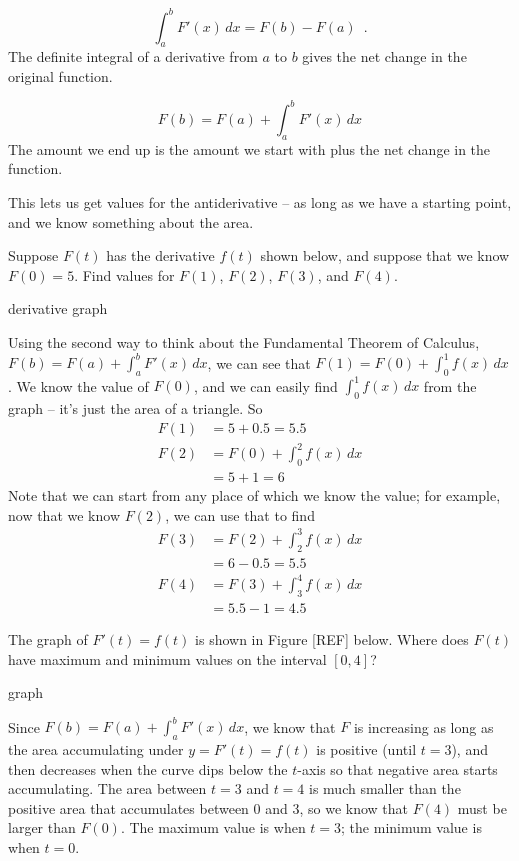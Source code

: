 \begin{theorem}
$$\int_a^b F'(x)\,dx = F(b)-F(a) \enspace .$$
The definite integral of a derivative from $a$ to $b$ gives the net change in the original function.

$$F(b)=F(a)+\int_a^b F'(x)\,dx$$
The amount we end up is the amount we start with plus the net change in the function.

This lets us get values for the antiderivative – as long as we have a starting point, and we know something about the area.

\begin{example}
Suppose $F(t)$ has the derivative $f(t)$ shown below, and suppose that we know $F(0)=5$. Find values for $F(1)$, $F(2)$, $F(3)$, and $F(4)$.

derivative graph
\begin{solution}
Using the second way to think about the Fundamental Theorem of Calculus, $F(b)=F(a)+\int_a^b F'(x)\,dx$, we can see that $F(1)=F(0)+\int_0^1 f(x)\,dx$. We know the value of $F(0)$, and we can easily find $\int_0^1 f(x)\,dx$ from the graph – it's just the area of a triangle. So
\begin{align*}
F(1) &= 5+0.5=5.5 \\
F(2) &= F(0)+\int_0^2 f(x)\,dx \\
    &= 5+1=6
\end{align*}
Note that we can start from any place of which we know the value; for example, now that we know $F(2)$, we can use that to find
\begin{align*}
F(3) &= F(2)+\int_2^3 f(x)\,dx \\
  &= 6-0.5 = 5.5 \\
F(4) &= F(3)+\int_3^4 f(x)\,dx  \\
  &= 5.5-1=4.5
\end{align*}
\end{solution}\end{example}

\begin{example}
The graph of $F'(t)=f(t)$ is shown in Figure [REF] below. Where does $F(t)$ have maximum and minimum values on the interval $[0, 4]$?

graph
\begin{solution}
Since $F(b)=F(a)+\int_a^b F'(x)\,dx$, we know that $F$ is increasing as long as the area accumulating under $y = F'(t)=f(t)$ is positive (until $t=3$), and then decreases when the curve dips below the $t$-axis so that negative area starts accumulating. The area between $t=3$ and $t=4$ is much smaller than the positive area that accumulates between 0 and 3, so we know that $F(4)$ must be larger than $F(0)$. The maximum value is when $t=3$; the minimum value is when $t=0$.
\end{solution}\end{example}


\end{theorem}
